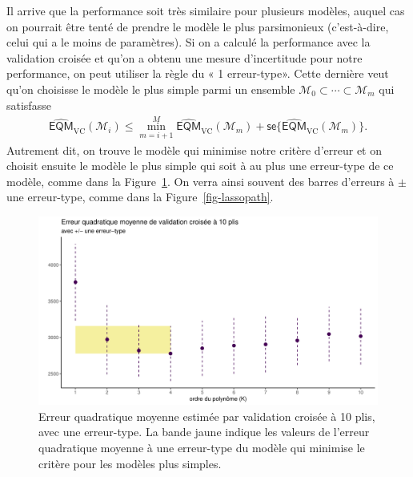 \documentclass[
  11pt,
  letterpaper,
]{scrbook}
\theoremstyle{definition}
\theoremstyle{remark}
\begin{document}
Il arrive que la performance soit très similaire pour plusieurs modèles,
auquel cas on pourrait être tenté de prendre le modèle le plus
parsimonieux (c'est-à-dire, celui qui a le moins de paramètres). Si on a
calculé la performance avec la validation croisée et qu'on a obtenu une
mesure d'incertitude pour notre performance, on peut utiliser la règle
du « 1 erreur-type». Cette dernière veut qu'on choisisse le modèle le
plus simple parmi un ensemble
\(\mathcal{M}_0 \subset\cdots \subset \mathcal{M}_m\) qui satisfasse
\begin{align*}
\widehat{\mathsf{EQM}}_{\text{VC}}(\mathcal{M}_i) \leq \min_{m = i+1}^M \widehat{\mathsf{EQM}}_{\text{VC}}(\mathcal{M}_m) + \mathsf{se}\{\widehat{\mathsf{EQM}}_{\text{VC}}(\mathcal{M}_m)\}.
\end{align*} Autrement dit, on trouve le modèle qui minimise notre
critère d'erreur et on choisit ensuite le modèle le plus simple qui soit
à au plus une erreur-type de ce modèle, comme dans la
Figure~\ref{fig-vc-1erreurtype}. On verra ainsi souvent des barres
d'erreurs à \(\pm\) une erreur-type, comme dans la
Figure~\ref{fig-lassopath}.

\begin{figure}[ht!]

{\centering \includegraphics[width=6in,height=\textheight]{figures/fig-validationcroisee-une-erreur-type.png}

}

\caption{\label{fig-vc-1erreurtype}Erreur quadratique moyenne estimée
par validation croisée à 10 plis, avec une erreur-type. La bande jaune
indique les valeurs de l'erreur quadratique moyenne à une erreur-type du
modèle qui minimise le critère pour les modèles plus simples.}

\end{figure}
\end{document}
